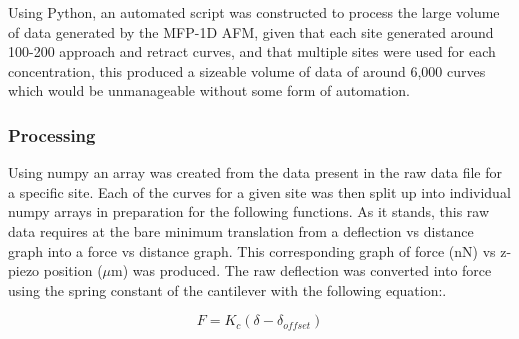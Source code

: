 Using Python\cite{python}, an automated script was constructed to process the large volume of data generated by the MFP-1D AFM, given that each site generated around 100-200 approach and retract curves, and that multiple sites were used for each concentration, this produced a sizeable volume of data of around 6,000 curves which would be unmanageable without some form of automation.










\subsubsection{Processing}

Using numpy\cite{numpy} an array was created from the data present in the raw data file for a specific site. Each of the curves for a given site was then split up into individual numpy arrays in preparation for the following functions. As it stands, this raw data requires at the bare minimum translation from a deflection vs distance graph into a force vs distance graph. This corresponding graph of force (nN) vs z-piezo position ($\mu$m) was produced. The raw deflection was converted into force using the spring constant of the cantilever with the following equation:\cite{KcConst}. %

\begin{equation}
F = K_c(\delta - \delta _{offset})
\end{equation}

